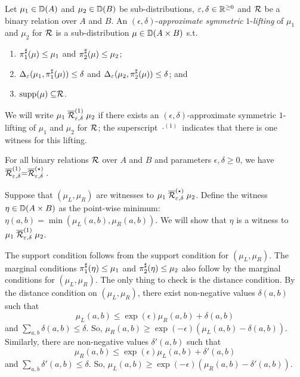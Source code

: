 \documentclass{lmcs}
\begin{document}
\begin{defi}
  Let $\mu_1 \in {\mathbb{D}}(A)$ and $\mu_2 \in {\mathbb{D}}(B)$ be sub-distributions,
  $\varepsilon, \delta \in \mathbb{R}^{\geq 0}$ and $\mathrel{\mathcal{R}}$ be a binary relation over $A
$ and $B$. An $(\epsilon, \delta)$-\emph{approximate symmetric}
  $1$-\emph{lifting} of $\mu_1$ and $\mu_2$ for $\mathrel{\mathcal{R}}$ is a
  sub-distribution $\mu \in {\mathbb{D}}(A \times B)$ s.t.
  \begin{enumerate}
    \item $\pi_{1}^{\sharp}(\mu) \leq \mu_1$ and $\pi_{2}^{\sharp}(\mu) \leq \mu_2$;
    \item $\Delta_\varepsilon(\mu_1, \pi_{1}^{\sharp}(\mu)) \leq \delta$ and
      $\Delta_\varepsilon(\mu_2, \pi_{2}^{\sharp}(\mu)) \leq \delta$; and
    \item $\operatorname{supp}(\mu) \subseteq \mathrel{\mathcal{R}}$.
  \end{enumerate}
  We will write
  $
    \mu_1 \mathrel{\overline{\mathrel{\mathcal{R}}}^{(1)}_{\varepsilon, \delta}} \mu_2
  $
  if there exists an $(\epsilon, \delta)$-approximate symmetric $1$-lifting of
  $\mu_1$ and $\mu_2$ for $\mathrel{\mathcal{R}}$; the superscript $\cdot^{(1)}$ indicates
  that there is one witness for this lifting.
\end{defi}

\begin{thm} \label{t:sym-1-star}
  For all binary relations $\mathrel{\mathcal{R}}$ over $A$ and $B$ and parameters
  $\epsilon, \delta \geq 0$, we have
  $
    \mathrel{\overline{\mathrel{\mathcal{R}}}^{(1)}_{\varepsilon, \delta}} = \mathrel{\overline{\mathrel{\mathcal{R}}}^{(\star)}_{\varepsilon, \delta}} .
  $
\end{thm}
\proofatend
  Suppose that $(\mu_L, \mu_R)$ are witnesses to $\mu_1
  \mathrel{\overline{\mathrel{\mathcal{R}}}^{(\star)}_{\varepsilon, \delta}} \mu_2$. Define the witness $\eta \in
  {\mathbb{D}}(A \times B)$ as the point-wise minimum: $\eta(a, b) =
  \min(\mu_L(a, b), \mu_R(a, b))$. We will show that $\eta$ is a witness to
  $\mu_1 \mathrel{\overline{\mathrel{\mathcal{R}}}^{(1)}_{\varepsilon, \delta}} \mu_2$.

  The support condition follows from the support condition for $(\mu_L, \mu_R)$.
  The marginal conditions $\pi_{1}^{\sharp}(\eta) \leq \mu_1$ and $\pi_{2}^{\sharp}(\eta) \leq \mu_2$
  also follow by the marginal conditions for $(\mu_L, \mu_R)$. The only thing to
  check is the distance condition. By the distance condition on $(\mu_L,
  \mu_R)$, there exist non-negative values $\delta(a, b)$ such that
  \[
    \mu_L(a, b) \leq \exp(\epsilon) \mu_R(a, b) + \delta(a, b)
  \]
  and $\sum_{a, b} \delta(a,b) \leq \delta$. So, $\mu_R(a, b) \geq
  \exp(-\epsilon) (\mu_L(a, b) - \delta(a, b))$. Similarly, there are
  non-negative values $\delta'(a, b)$ such that
  \[
    \mu_R(a, b) \leq \exp(\epsilon) \mu_L(a, b) + \delta'(a, b)
  \]
  and $\sum_{a, b} \delta'(a,b) \leq \delta$. So, $\mu_L(a, b) \geq
  \exp(-\epsilon) (\mu_R(a, b) - \delta'(a, b))$.
  
\end{document}
